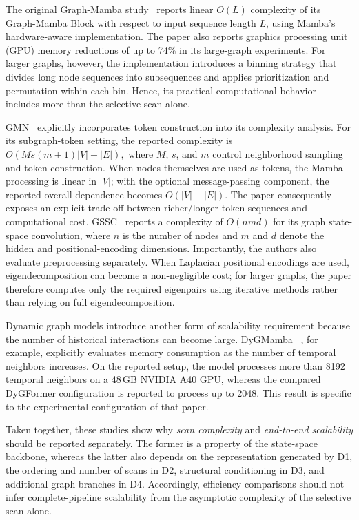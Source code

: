 \documentclass[acmsmall]{acmart}
\begin{document}
The original Graph-Mamba study~\cite{wang2024graph} reports linear
$O(L)$ complexity of its Graph-Mamba Block with respect to input sequence
length $L$, using Mamba's hardware-aware implementation. The paper also reports graphics processing unit (GPU) memory reductions
of up to 74\% in its large-graph experiments.
For larger graphs, however, the implementation introduces a binning strategy
that divides long node sequences into subsequences and applies prioritization
and permutation within each bin. Hence, its practical computational behavior
includes more than the selective scan alone.

GMN~\cite{behrouz2024graph} explicitly incorporates token construction into
its complexity analysis. For its subgraph-token setting, the reported
complexity is
$O\!\left(Ms(m+1)|V|+|E|\right),$
where $M$, $s$, and $m$ control neighborhood sampling and token construction.
When nodes themselves are used as tokens, the Mamba processing is linear in
$|V|$; with the optional message-passing component, the reported overall
dependence becomes $O(|V|+|E|)$. The paper consequently exposes an explicit
trade-off between richer/longer token sequences and computational cost.
GSSC~\cite{huang2024can} reports a complexity of
$O(nmd)$ for its graph state-space convolution, where $n$ is the number of
nodes and $m$ and $d$ denote the hidden and positional-encoding dimensions.
Importantly, the authors also evaluate preprocessing separately. When
Laplacian positional encodings are used, eigendecomposition can become a
non-negligible cost; for larger graphs, the paper therefore computes only the
required eigenpairs using iterative methods rather than relying on full
eigendecomposition.

Dynamic graph models introduce another form of scalability requirement because
the number of historical interactions can become large.
DyGMamba
~\cite{ding2024dygmamba}, for example, explicitly evaluates memory consumption
as the number of temporal neighbors increases. On the reported setup, the model
processes more than 8192 temporal neighbors on a 48\,GB NVIDIA A40 GPU, whereas
the compared DyGFormer configuration is reported to process up to 2048. This
result is specific to the experimental configuration of that paper.

Taken together, these studies show why \emph{scan complexity} and
\emph{end-to-end scalability} should be reported separately. The former is a
property of the state-space backbone, whereas the latter also depends on the
representation generated by D1, the ordering and number of scans in D2,
structural conditioning in D3, and additional graph branches in D4.
Accordingly, efficiency comparisons should not infer complete-pipeline
scalability from the asymptotic complexity of the selective scan alone.
\end{document}
